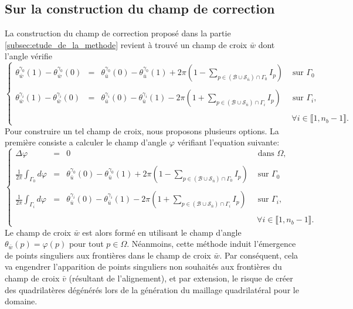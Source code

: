 \subsection{Sur la construction du champ de correction}
La construction du champ de correction proposé dans la partie \ref{subsec:etude_de_la_methode} revient à trouvé un champ de croix $\bar{w}$ dont l'angle vérifie
\begin{equation}
    \left\{
    \begin{array}{lcll}
    \theta_{\bar{w}}^{\gamma_0}(1)-\theta_{\bar{w}}^{\gamma_0}(0)&=&\theta_{\bar{u}}^{\gamma_0}(0)-\theta_{\bar{u}}^{\gamma_0}(1)+2\pi\left(1-\displaystyle\sum_{p\in(\mathcal{B}\cup\mathcal{S}_{\bar{n}})\cap\Gamma_0}I_p\right)&\mbox{ sur }\Gamma_0\\\\
    \theta_{\bar{w}}^{\gamma_i}(1)-\theta_{\bar{w}}^{\gamma_i}(0)&=&\theta_{\bar{u}}^{\gamma_i}(0)-\theta_{\bar{u}}^{\gamma_i}(1)-2\pi\left(1+\displaystyle\sum_{p\in(\mathcal{B}\cup\mathcal{S}_{\bar{n}})\cap\Gamma_i}I_p\right)&\mbox{ sur }\Gamma_i,\\\\
    &&&~\forall i\in\llbracket 1, n_b-1\rrbracket.
    \end{array}
    \right.
    \label{eqn:disc_hypothese_w}
\end{equation}
Pour construire un tel champ de croix, nous proposons plusieurs options. La première consiste a calculer le champ d'angle $\varphi$ vérifiant l'equation suivante:
\begin{equation}
\left\{
\begin{array}{lcll}
    \Delta\varphi &=& 0 & \mbox{ dans }\Omega,\\\\
    \displaystyle\frac{1}{2\pi}\displaystyle\int_{\Gamma_0}d\varphi &=& \theta_{\bar{u}}^{\gamma_0}(0)-\theta_{\bar{u}}^{\gamma_0}(1)+2\pi\left(1-\displaystyle\sum_{p\in(\mathcal{B}\cup\mathcal{S}_{\bar{n}})\cap\Gamma_0}I_p\right)&\mbox{ sur }\Gamma_0\\\\
    \displaystyle\frac{1}{2\pi}\displaystyle\int_{\Gamma_i}d\varphi &=& \theta_{\bar{u}}^{\gamma_i}(0)-\theta_{\bar{u}}^{\gamma_i}(1)-2\pi\left(1+\displaystyle\sum_{p\in(\mathcal{B}\cup\mathcal{S}_{\bar{n}})\cap\Gamma_i}I_p\right)&\mbox{ sur }\Gamma_i,\\\\
    &&&~\forall i\in\llbracket 1, n_b-1\rrbracket.
\end{array}
\right.
\end{equation}
Le champ de croix $\bar{w}$ est alors formé en utilisant le champ d'angle $\theta_{\bar{w}}(p)=\varphi(p)$ pour tout $p\in\Omega$. Néanmoins, cette méthode induit l'émergence de points singuliers aux frontières dans le champ de croix $\bar{w}$. Par conséquent, cela va engendrer l'apparition de points singuliers non souhaités aux frontières du champ de croix $\bar{v}$ (résultant de l'alignement), et par extension, le risque de créer des quadrilatères dégénérés lors de la génération du maillage quadrilatéral pour le domaine.

